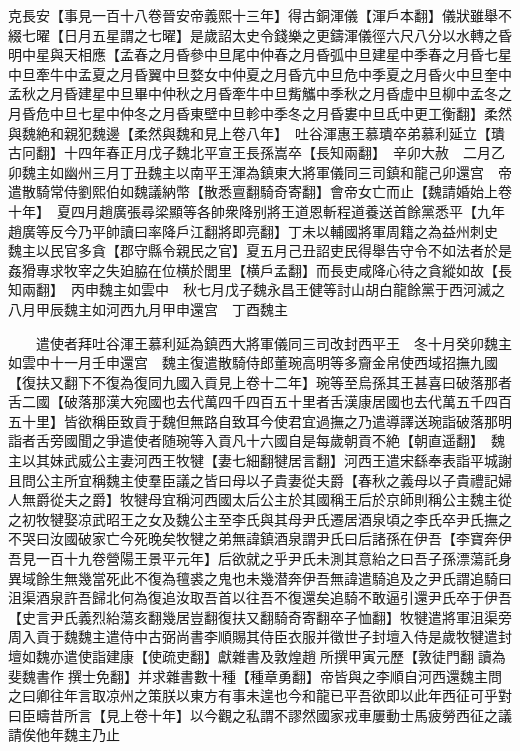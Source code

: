 克長安【事見一百十八卷晉安帝義熙十三年】得古銅渾儀【渾戶本翻】儀狀雖舉不綴七曜【日月五星謂之七曜】是歲詔太史令錢樂之更鑄渾儀徑六尺八分以水轉之昏明中星與天相應【孟春之月昏參中旦尾中仲春之月昏弧中旦建星中季春之月昏七星中旦牽牛中孟夏之月昏翼中旦婺女中仲夏之月昏亢中旦危中季夏之月昏火中旦奎中孟秋之月昏建星中旦畢中仲秋之月昏牽牛中旦觜觿中季秋之月昏虚中旦柳中孟冬之月昏危中旦七星中仲冬之月昏東壁中旦軫中季冬之月昏婁中旦氐中更工衡翻】柔然與魏絶和親犯魏邊【柔然與魏和見上卷八年】　吐谷渾惠王慕璝卒弟慕利延立【璝古冋翻】十四年春正月戊子魏北平宣王長孫嵩卒【長知兩翻】　辛卯大赦　二月乙卯魏主如幽州三月丁丑魏主以南平王渾為鎮東大將軍儀同三司鎮和龍己卯還宫　帝遣散騎常侍劉熙伯如魏議納幣【散悉亶翻騎奇寄翻】會帝女亡而止【魏請婚始上卷十年】　夏四月趙廣張尋梁顯等各帥衆降别將王道恩斬程道養送首餘黨悉平【九年趙廣等反今乃平帥讀曰率降戶江翻將即亮翻】丁未以輔國將軍周籍之為益州刺史　魏主以民官多貪【郡守縣令親民之官】夏五月己丑詔吏民得舉告守令不如法者於是姦猾專求牧宰之失廹脇在位横於閭里【横戶孟翻】而長吏咸降心待之貪縱如故【長知兩翻】　丙申魏主如雲中　秋七月戊子魏永昌王健等討山胡白龍餘黨于西河滅之八月甲辰魏主如河西九月甲申還宫　丁酉魏主

　　遣使者拜吐谷渾王慕利延為鎮西大將軍儀同三司改封西平王　冬十月癸卯魏主如雲中十一月壬申還宫　魏主復遣散騎侍郎董琬高明等多齎金帛使西域招撫九國【復扶又翻下不復為復同九國入貢見上卷十二年】琬等至烏孫其王甚喜曰破落那者舌二國【破落那漢大宛國也去代萬四千四百五十里者舌漢康居國也去代萬五千四百五十里】皆欲稱臣致貢于魏但無路自致耳今使君宜過撫之乃遣導譯送琬詣破落那明詣者舌旁國聞之爭遣使者随琬等入貢凡十六國自是每歲朝貢不絶【朝直遥翻】　魏主以其妹武威公主妻河西王牧犍【妻七細翻犍居言翻】河西王遣宋繇奉表詣平城謝且問公主所宜稱魏主使羣臣議之皆曰母以子貴妻從夫爵【春秋之義母以子貴禮記婦人無爵從夫之爵】牧犍母宜稱河西國太后公主於其國稱王后於京師則稱公主魏主從之初牧犍娶凉武昭王之女及魏公主至李氏與其母尹氏遷居酒泉頃之李氏卒尹氏撫之不哭曰汝國破家亡今死晚矣牧犍之弟無諱鎮酒泉謂尹氏曰后諸孫在伊吾【李寶奔伊吾見一百十九卷營陽王景平元年】后欲就之乎尹氏未測其意紿之曰吾子孫漂蕩託身異域餘生無幾當死此不復為氊裘之鬼也未幾潜奔伊吾無諱遣騎追及之尹氏謂追騎曰沮渠酒泉許吾歸北何為復追汝取吾首以往吾不復還矣追騎不敢逼引還尹氏卒于伊吾【史言尹氏義烈紿蕩亥翻幾居豈翻復扶又翻騎奇寄翻卒子恤翻】牧犍遣將軍沮渠旁周入貢于魏魏主遣侍中古弼尚書李順賜其侍臣衣服并徵世子封壇入侍是歲牧犍遣封壇如魏亦遣使詣建康【使疏吏翻】獻雜書及敦煌趙所撰甲寅元歷【敦徒門翻讀為斐魏書作撰士免翻】并求雜書數十種【種章勇翻】帝皆與之李順自河西還魏主問之曰卿往年言取凉州之策朕以東方有事未遑也今和龍已平吾欲即以此年西征可乎對曰臣疇昔所言【見上卷十年】以今觀之私謂不謬然國家戎車屢動士馬疲勞西征之議請俟他年魏主乃止


